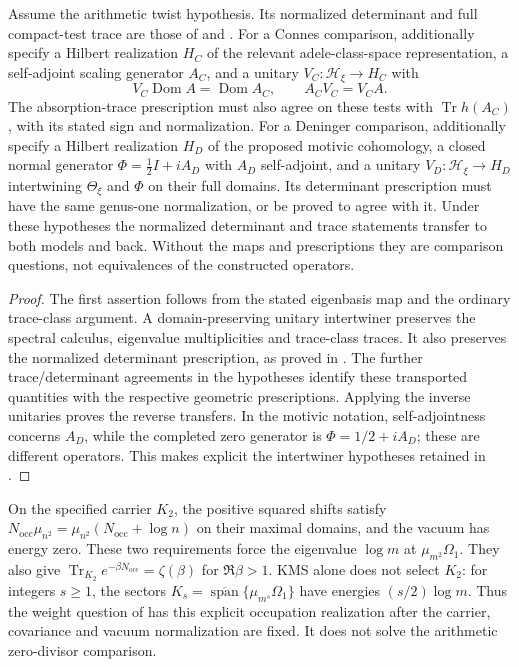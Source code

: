 \begin{theorem}
\label{v4-arith:w5-b:thm:precise-obstruction}
Assume the arithmetic twist hypothesis. Its normalized determinant
and full compact-test trace are those of
 and
.
For a Connes comparison, additionally specify a Hilbert realization
$H_C$ of the relevant adele-class-space representation, a
self-adjoint scaling generator $A_C$, and a unitary
$V_C:\mathcal H_\xi\to H_C$ with
\[
 V_C\operatorname{Dom}A=\operatorname{Dom}A_C,\qquad
 A_CV_C=V_CA.
\]
The absorption-trace prescription must also agree on these tests
with $\operatorname{Tr}h(A_C)$, with its stated sign and normalization.
For a Deninger comparison, additionally specify a Hilbert
realization $H_D$ of the proposed motivic cohomology, a closed normal
generator $\Phi=\tfrac12I+iA_D$ with $A_D$ self-adjoint, and a unitary
$V_D:\mathcal H_\xi\to H_D$ intertwining $\Theta_\xi$ and $\Phi$
on their full domains. Its determinant prescription must have the
same genus-one normalization, or be proved to agree with it.
Under these hypotheses the normalized determinant and trace
statements transfer to both models and back. Without the maps and
prescriptions they are comparison questions, not equivalences of
the constructed operators.
\end{theorem}
\begin{proof}
The first assertion follows from the stated eigenbasis map and the
ordinary trace-class argument. A domain-preserving unitary
intertwiner preserves the spectral calculus, eigenvalue
multiplicities and trace-class traces. It also preserves the
normalized determinant prescription, as proved in
. The further trace/determinant
agreements in the hypotheses identify these transported quantities
with the respective geometric prescriptions. Applying the inverse
unitaries proves the reverse transfers. In the motivic notation,
self-adjointness concerns $A_D$, while the completed zero generator
is $\Phi=1/2+iA_D$; these are different operators. This makes
explicit the intertwiner hypotheses retained in
.
\end{proof}

\begin{remark}
\label{v4-arith:w5-b:rem:W-honest}
On the specified carrier $K_2$, the positive squared shifts satisfy
$N_{\mathrm{occ}}\mu_{n^2}=\mu_{n^2}(N_{\mathrm{occ}}+\log n)$
on their maximal domains, and the vacuum has energy zero.
These two requirements force the eigenvalue $\log m$ at
$\mu_{m^2}\Omega_1$. They also give
$\operatorname{Tr}_{K_2}e^{-\beta N_{\mathrm{occ}}}=\zeta(\beta)$
for $\Re\beta>1$.
KMS alone does not select $K_2$: for integers $s\geq1$, the sectors
$K_s=\overline{\operatorname{span}}\{\mu_{m^s}\Omega_1\}$ have
energies $(s/2)\log m$. Thus the weight question of
 has this explicit
occupation realization after the carrier, covariance and vacuum
normalization are fixed. It does not solve the arithmetic
zero-divisor comparison.
\end{remark}

